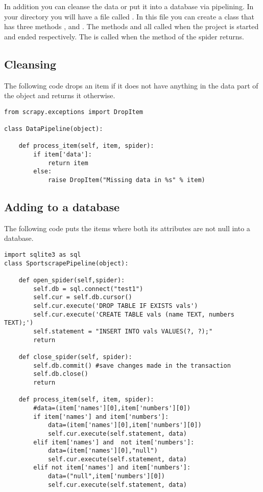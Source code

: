 In addition you can cleanse the data or put it into a database via pipelining.
In your directory  you will have a file called .
In this file you can create a class that has three methods ,  and .
The methods  and  all called when the project is started and ended respectively.
The  is called when the  method of the spider returns. 

\subsection*{Cleansing}

The following code drops an item if it does not have anything in the data part of the object and returns it otherwise.

\begin{lstlisting}
from scrapy.exceptions import DropItem

class DataPipeline(object):

    def process_item(self, item, spider):
        if item['data']:
            return item
        else:
            raise DropItem("Missing data in %s" % item)
\end{lstlisting}

\subsection*{Adding to a database}
The following code puts the items where both its attributes are not null into a database. 
\begin{lstlisting}
import sqlite3 as sql
class SportscrapePipeline(object):
	
	def open_spider(self,spider):
		self.db = sql.connect("test1")
		self.cur = self.db.cursor()
		self.cur.execute('DROP TABLE IF EXISTS vals')
		self.cur.execute('CREATE TABLE vals (name TEXT, numbers TEXT);')
		self.statement = "INSERT INTO vals VALUES(?, ?);"
		return

	def close_spider(self, spider):
		self.db.commit() #save changes made in the transaction
		self.db.close()
		return

	def process_item(self, item, spider):
		#data=(item['names'][0],item['numbers'][0])
		if item['names'] and item['numbers']:
			data=(item['names'][0],item['numbers'][0])
			self.cur.execute(self.statement, data)
		elif item['names'] and  not item['numbers']:
			data=(item['names'][0],"null")
			self.cur.execute(self.statement, data)
		elif not item['names'] and item['numbers']:
			data=("null",item['numbers'][0])
			self.cur.execute(self.statement, data)
\end{lstlisting}

